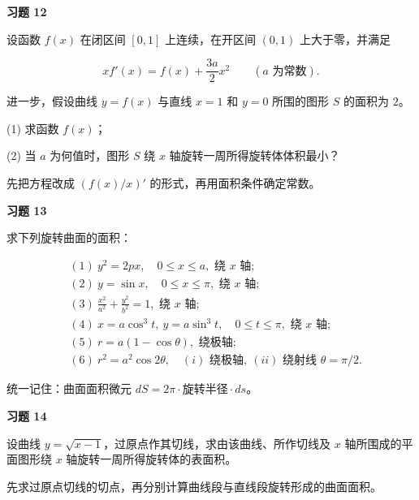 \begin{exercisebox}
\textbf{习题 12 }

设函数 \(f(x)\) 在闭区间 \([0,1]\) 上连续，在开区间 \((0,1)\) 上大于零，并满足

\[
      xf'(x)=f(x)+\frac{3a}{2}x^2\qquad(a\text{ 为常数}).
      \]

进一步，假设曲线 \(y=f(x)\) 与直线 \(x=1\) 和 \(y=0\) 所围的图形 \(S\) 的面积为 \(2\)。

(1) 求函数 \(f(x)\)；

(2) 当 \(a\) 为何值时，图形 \(S\) 绕 \(x\) 轴旋转一周所得旋转体体积最小？

\begin{hintbox}
先把方程改成 \(\left(f(x)/x\right)'\) 的形式，再用面积条件确定常数。
\end{hintbox}
\end{exercisebox}

\begin{exercisebox}
\textbf{习题 13 }

求下列旋转曲面的面积：

\[
      \begin{aligned}
      &(1)\ y^2=2px,\quad0\le x\le a,\text{ 绕 }x\text{ 轴};\\
      &(2)\ y=\sin x,\quad0\le x\le\pi,\text{ 绕 }x\text{ 轴};\\
      &(3)\ \frac{x^2}{a^2}+\frac{y^2}{b^2}=1,\text{ 绕 }x\text{ 轴};\\
      &(4)\ x=a\cos^3t,\ y=a\sin^3t,\quad0\le t\le\pi,\text{ 绕 }x\text{ 轴};\\
      &(5)\ r=a(1-\cos\theta),\text{ 绕极轴};\\
      &(6)\ r^2=a^2\cos2\theta,\quad (i)\text{ 绕极轴},\ (ii)\text{ 绕射线 }\theta=\pi/2.
      \end{aligned}
      \]

\begin{hintbox}
统一记住：曲面面积微元 \(dS=2\pi\cdot\text{旋转半径}\cdot ds\)。
\end{hintbox}
\end{exercisebox}

\begin{exercisebox}
\textbf{习题 14 }

设曲线 \(y=\sqrt{x-1}\)，过原点作其切线，求由该曲线、所作切线及 \(x\) 轴所围成的平面图形绕 \(x\) 轴旋转一周所得旋转体的表面积。

\begin{hintbox}
先求过原点切线的切点，再分别计算曲线段与直线段旋转形成的曲面面积。
\end{hintbox}
\end{exercisebox}

